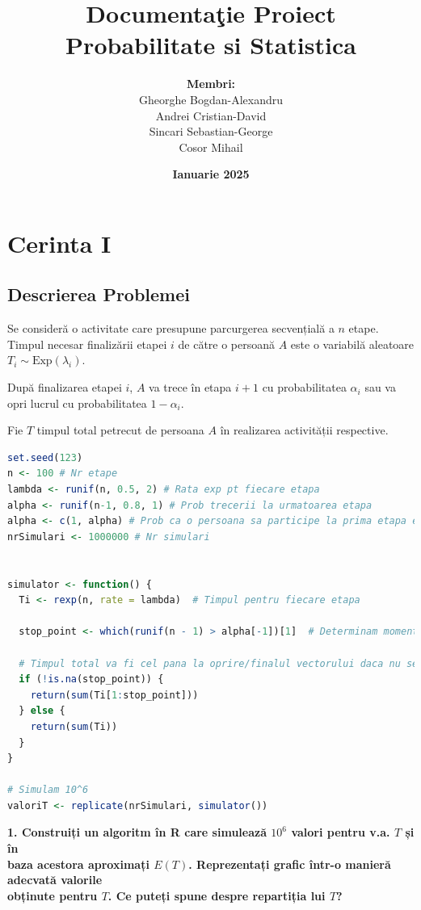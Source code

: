 \documentclass[a4paper,11pt]{article}
\title{\Huge\textbf{Documenta\c{t}ie Proiect} \\ \Large Probabilitate si Statistica}
\author{\textbf{Membri:} \\ Gheorghe Bogdan-Alexandru \\ Andrei Cristian-David \\ Sincari Sebastian-George \\ Cosor Mihail}
\date{\textbf{Ianuarie 2025}}
\begin{document}
\begingroup
\centering
\maketitle
\endgroup

\tableofcontents

\newpage

\section*{Cerinta I}

\subsection*{Descrierea Problemei}

Se consideră o activitate care presupune parcurgerea secvențială a \( n \) etape. Timpul necesar finalizării etapei \( i \) de către o persoană \( A \) este o variabilă aleatoare \( T_i \sim \text{Exp}(\lambda_i) \).

După finalizarea etapei \( i \), \( A \) va trece în etapa \( i+1 \) cu probabilitatea \( \alpha_i \) sau va opri lucrul cu probabilitatea \( 1 - \alpha_i \).

Fie \( T \) timpul total petrecut de persoana \( A \) în realizarea activității respective.

\begin{lstlisting}[language=R]
set.seed(123)
n <- 100 # Nr etape
lambda <- runif(n, 0.5, 2) # Rata exp pt fiecare etapa
alpha <- runif(n-1, 0.8, 1) # Prob trecerii la urmatoarea etapa
alpha <- c(1, alpha) # Prob ca o persoana sa participe la prima etapa este 100%
nrSimulari <- 1000000 # Nr simulari


simulator <- function() {
  Ti <- rexp(n, rate = lambda)  # Timpul pentru fiecare etapa

  stop_point <- which(runif(n - 1) > alpha[-1])[1]  # Determinam momentul opririi

  # Timpul total va fi cel pana la oprire/finalul vectorului daca nu se opreste
  if (!is.na(stop_point)) {
    return(sum(Ti[1:stop_point])) 
  } else {
    return(sum(Ti))
  }
}

# Simulam 10^6
valoriT <- replicate(nrSimulari, simulator())
\end{lstlisting}
\textbf{1. Construiți un algoritm în R care simulează $10^6$ valori pentru v.a. $T$ și în \\baza acestora aproximați $E(T)$. Reprezentați grafic într-o manieră adecvată valorile \\obținute pentru $T$. Ce puteți spune despre repartiția lui $T$?}
\end{document}
